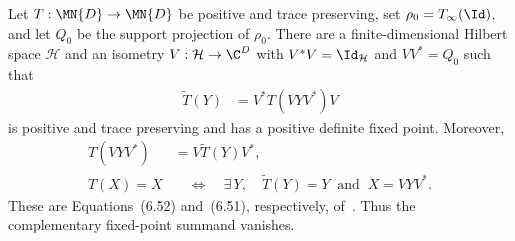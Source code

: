 \begin{theorem}%
    \label{thm:stationarySupport_compression}
    \leanok
    Let $T:\MN{D}\to\MN{D}$ be positive and trace preserving, set
    $\rho_0=T_\infty(\Id)$, and let $Q_0$ be the support projection of
    $\rho_0$. There are a finite-dimensional Hilbert space $\mathcal H$ and
    an isometry $V:\mathcal H\to\C^D$ with
    $V^*V=\Id_{\mathcal H}$ and $VV^*=Q_0$ such that
    \begin{align}
        \widetilde T(Y)
         & =V^*T(VYV^*)V
        \label{eq:spectral_ds_support_compression}
    \end{align}
    is positive and trace preserving and has a positive definite fixed
    point. Moreover,
    \begin{align}
        T(VYV^*)
         & =V\widetilde T(Y)V^*,
        \label{eq:spectral_ds_compression_intertwining} \\
        T(X)=X
         & \quad\Longleftrightarrow\quad
        \exists\,Y,\quad
        \widetilde T(Y)=Y\ \text{ and }\ X=VYV^*.
        \label{eq:spectral_ds_compression_fixed}
    \end{align}
    These are Equations~(6.52) and~(6.51), respectively,
    of~\cite{Wolf2012Quantum}. Thus the complementary fixed-point summand
    vanishes.
\end{theorem}

